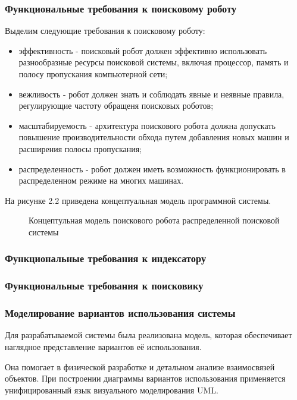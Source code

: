 \subsubsection{Функциональные требования к поисковому роботу}
Выделим следующие требования к поисковому роботу:
\begin{itemize}
\item эффективность - поисковый робот должен эффективно использовать разнообразные ресурсы поисковой системы, включая процессор, память и полосу пропускания компьютерной сети;
\item вежливость - робот должен знать и соблюдать явные и неявные правила, регулирующие частоту обращеня поисковых роботов;
\item масштабируемость - архитектура поискового робота  должна допускать повышение производительности обхода путем добавления новых машин и расширения полосы пропускания;
\item распределенность - робот должен иметь возможность функционировать в распределенном режиме на многих машинах.
\end{itemize}

На рисунке 2.2 приведена концептуальная модель программной системы.

\begin{figure}
\caption{Концептульная модель поискового робота распределенной поисковой системы}
\label{concept_robot_model:image}
\end{figure}

\subsubsection{Функциональные требования к индексатору}

\subsubsection{Функциональные требования к поисковику}

\subsubsection{Моделирование вариантов использования системы}

Для разрабатываемой системы была реализована модель, которая обеспечивает наглядное представление вариантов её использования.

Она помогает в физической разработке и детальном анализе взаимосвязей объектов. При построении диаграммы вариантов использования применяется унифицированный язык визуального моделирования UML.

